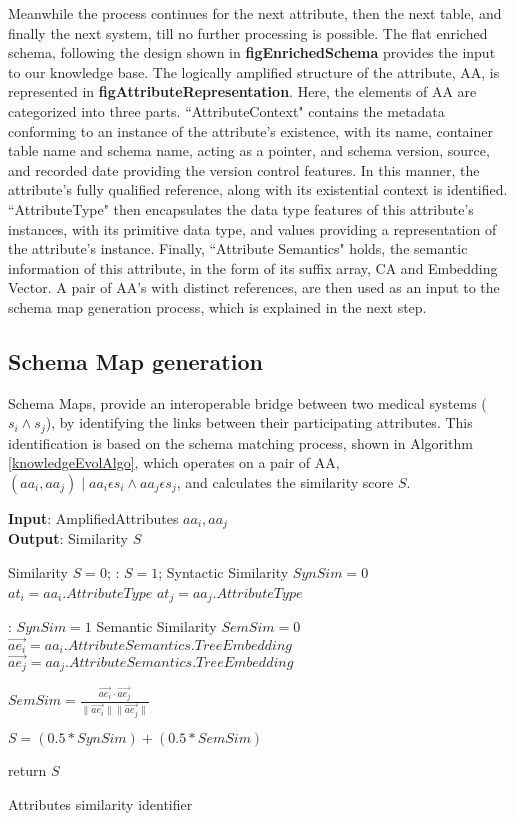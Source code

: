 Meanwhile the process continues for the next attribute, then the next table, and finally the next system, till no further processing is possible. The flat enriched schema, following the design shown in \textbf{figEnrichedSchema} provides the input to our knowledge base. The logically amplified structure of the attribute, AA, is represented in \textbf{figAttributeRepresentation}. Here, the elements of AA are categorized into three parts. ``AttributeContext" contains the metadata conforming to an instance of the attribute's existence,  with its name, container table name and schema name, acting as a pointer, and schema version, source, and recorded date providing the version control features. In this manner, the attribute's fully qualified reference, along with its existential context is identified. ``AttributeType" then encapsulates the data type features of this attribute's instances, with its primitive data type, and values providing a representation of the attribute's instance. Finally, ``Attribute Semantics" holds, the semantic information of this attribute, in the form of its suffix array, CA and Embedding Vector.
A pair of AA's with distinct references, are then used as an input to the schema map generation process, which is explained in the next step.

\subsection*{Schema Map generation}
\label{schema_map_gen}
Schema Maps, provide an interoperable bridge between two medical systems ($s_i \wedge s_j$), by identifying the links between their participating attributes. This identification is based on the schema matching process, shown in Algorithm \ref{knowledgeEvolAlgo}, which operates on a pair of AA, $\left ( aa_i,aa_j \right ) \mid aa_i \epsilon s_i \wedge aa_j \epsilon s_j$, and calculates the similarity score $S$.


\begin{algorithm}
	\textbf{Input}: AmplifiedAttributes $ aa_i, aa_j$ \\
	\textbf{Output}: Similarity $S$ 
	\begin{algorithmic}[1]
		\State Similarity $S = 0$;
		:
		\State $S = 1$;
		\Else
		\State Syntactic Similarity $SynSim = 0 $
		\State $at_i = aa_i.AttributeType$
		\State $at_j = aa_j.AttributeType$
		
		: 
		\State	$SynSim = 1$
		\EndIf
		\State Semantic Similarity $SemSim = 0 $
		\State $\vec{ae_i} =  aa_i.Attribute Semantics
		.TreeEmbedding$
		\State $\vec{ae_j} =  aa_j.Attribute Semantics
		.TreeEmbedding$
		
		\State $SemSim = \frac{\vec{ae_i} \cdot \vec{ae_j}}{\|\vec{ae_i}\|\|\vec{ae_j}\|}$
		
		\State $S = (0.5 * SynSim) + (0.5 * SemSim) $
		\EndIf
		
		\State return $S$
		\caption{Attributes similarity identifier}
		\label{knowledgeEvolAlgo}
	\end{algorithmic}
\end{algorithm}

